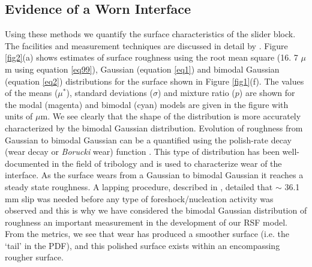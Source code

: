 \documentclass[final,3p, 11pt,authoryear]{elsarticle}
\begin{document}
\subsection{Evidence of a Worn Interface}
\label{SurfaceWear}
Using these methods we quantify the surface characteristics of the slider block. The facilities and measurement techniques are discussed in detail by \citet{Selvadurai2017}.  Figure \ref{fig2}(a) shows estimates of surface roughness using the root mean square (16. 7 $\mu$m using equation \eqref{eq99}), Gaussian (equation \eqref{eq1}) and bimodal Gaussian (equation \eqref{eq2}) distributions for the surface shown in Figure \ref{fig1}(f). The values of the means ($\mu^{*}$), standard deviations ($\sigma$) and mixture ratio ($p$) are shown for the modal (magenta) and bimodal (cyan) models are given in the figure with units of $\mu$m.  We see clearly that the shape of the distribution is more accurately characterized by the bimodal Gaussian distribution.  Evolution of roughness from Gaussian to bimodal Gaussian can be a quantified using the polish-rate decay (wear decay or \textit{Borucki} wear) function \citep{Borucki2002, Borucki2004, Ciavarella2016}. This type of distribution has been well-documented in the field of tribology and is used to characterize wear of the interface. As the surface wears from a Gaussian to bimodal Gaussian it reaches a steady state roughness.  A lapping procedure, described in \citet{Selvadurai2015}, detailed that $\sim$ 36.1 mm slip was needed before any type of foreshock/nucleation activity was observed and this is why we have considered the bimodal Gaussian distribution of roughness an important measurement in the development of our RSF model.  From the metrics, we see that wear has produced a smoother surface (i.e.  the `tail' in the PDF), and this polished surface exists within an encompassing rougher surface.     
\end{document}
